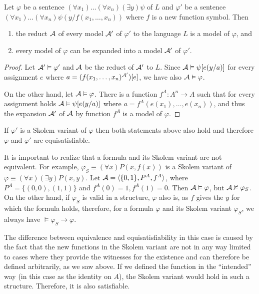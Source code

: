 \begin{lemma}
Let $\varphi$ be a sentence $(\forall x_1)\dots(\forall x_n)(\exists y)\psi$ of $L$ and $\varphi'$ be a sentence $(\forall x_1)\dots(\forall x_n)\psi(y/f(x_1, \dots, x_n))$ where $f$ is a new function symbol. Then
\begin{enumerate}
	\item the reduct $\mathcal{A}$ of every model $\mathcal{A}'$ of $\varphi'$ to the language $L$ is a model of $\varphi$, and
	\item every model of $\varphi$ can be expanded into a model $\mathcal{A}'$ of $\varphi'$.
\end{enumerate}
\end{lemma}
\begin{proof}
Let $\mathcal{A}' \vDash \varphi'$ and $\mathcal{A}$ be the reduct of $\mathcal{A}'$ to $L$. Since $\mathcal{A} \vDash \psi[e(y/a)]$ for every assignment $e$ where $a = (f(x_1, \dots, x_n)^{\mathcal{A}'})[e]$, we have also $\mathcal{A} \vDash \varphi$.

On the other hand, let $\mathcal{A} \vDash \varphi$. There is a function $f^A: A^n \to A$ such that for every assignment holds $\mathcal{A} \vDash \psi[e(y/a)]$ where $a = f^A(e(x_1), \dots, e(x_n))$, and thus the expansion $\mathcal{A}'$ of $\mathcal{A}$ by function $f^A$ is a model of $\varphi$.
\end{proof}

If $\varphi'$ is a Skolem variant of $\varphi$ then both statements above also hold and therefore $\varphi$ and $\varphi'$ are equisatisfiable.

It is important to realize that a formula and its Skolem variant are not equivalent. For example, $\varphi_S \equiv (\forall x)P(x,f(x))$ is a Skolem variant of $\varphi \equiv (\forall x)(\exists y)P(x,y)$. Let $\mathcal{A} =\langle \{0,1\}, P^A, f^A \rangle$, where $P^A = \{(0,0), (1,1)\}$ and $f^A(0)=1, f^A(1)=0$. Then $\mathcal{A} \vDash \varphi$, but $\mathcal{A} \nvDash \varphi_S$. On the other hand, if $\varphi_S$ is valid in a structure, $\varphi$ also is, as $f$ gives the $y$ for which the formula holds, therefore, for a formula $\varphi$ and its Skolem variant $\varphi_S$, we always have $\vDash \varphi_S \to \varphi$. 

The difference between equivalence and equisatisfiability in this case is caused by the fact that the new functions in the Skolem variant are not in any way limited to cases where they provide the witnesses for the existence and can therefore be defined arbitrarily, as we saw above. If we defined the function in the ``intended'' way (in this case as the identity on $A$), the Skolem variant would hold in such a structure. Therefore, it is also satisfiable.


